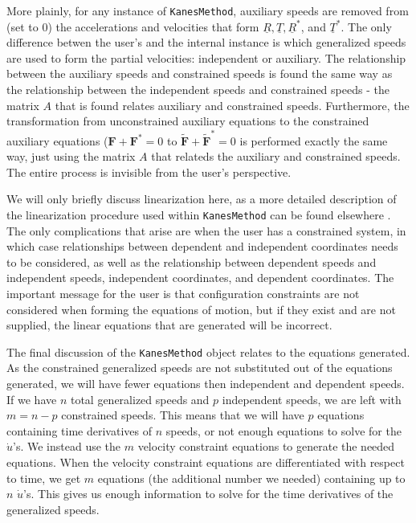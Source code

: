 \documentclass[twocolumn,10pt]{asme2e}
\begin{document}
More plainly, for any instance of \verb|KanesMethod|, auxiliary speeds are
removed from (set to 0) the accelerations and velocities that form
$\underline{R}, \underline{T}, \underline{R}^*$, and $\underline{T}^*$.
The only difference betwen the user's and the internal instance is which
generalized speeds are used to form the partial velocities: independent or
auxiliary.
The relationship between the auxiliary speeds and constrained speeds is found
the same way as the relationship between the independent speeds and constrained
speeds - the matrix $A$ that is found relates auxiliary and constrained
speeds.
Furthermore, the transformation from unconstrained auxiliary equations to the
constrained auxiliary equations ($\mathbf{F} + \mathbf{F}^*=0$ to
$\tilde{\mathbf{F}} + \tilde{\mathbf{F}}^* = 0$ is performed exactly the same
way, just using the matrix $A$ that relateds the auxiliary and constrained
speeds.
The entire process is invisible from the user's perspective.

We will only briefly discuss linearization here, as a more detailed description
of the linearization procedure used within \verb|KanesMethod| can be found
elsewhere \cite{Peterson2013}.
The only complications that arise are when the user has a constrained system,
in which case relationships between dependent and independent coordinates needs
to be considered, as well as the relationship between dependent speeds and
independent speeds, independent coordinates, and dependent coordinates.
The important message for the user is that configuration constraints are not
considered when forming the equations of motion, but if they exist and are not
supplied, the linear equations that are generated will be incorrect.

The final discussion of the \verb|KanesMethod| object relates to the equations
generated.
As the constrained generalized speeds are not substituted out of the equations
generated, we will have fewer equations then independent and dependent speeds.
If we have $n$ total generalized speeds and $p$ independent speeds, we are left
with $m=n-p$ constrained speeds.
This means that we will have $p$ equations containing time derivatives of $n$
speeds, or not enough equations to solve for the $\dot{u}$'s.
We instead use the $m$ velocity constraint equations to generate the needed
equations.
When the velocity constraint equations are differentiated with respect to time,
we get $m$ equations (the additional number we needed) containing up to $n$
$\dot{u}$'s.
This gives us enough information to solve for the time derivatives of the
generalized speeds.
\end{document}
